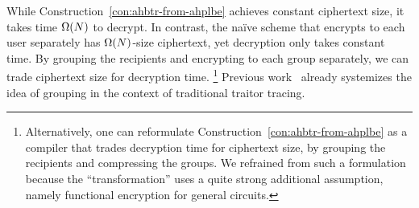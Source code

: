 While Construction~\ref{con:ahbtr-from-ahplbe} achieves constant ciphertext size,
it takes time $\operatorname{\Omega}(N)$ to decrypt.
In contrast, the na{\"i}ve scheme that encrypts to each user separately has $\operatorname{\Omega}(N)$-size ciphertext,
yet decryption only takes constant time.
By grouping the recipients and encrypting to each group separately,
we can trade ciphertext size for decryption time.%
\footnote{Alternatively, one can reformulate Construction~\ref{con:ahbtr-from-ahplbe} as a compiler that trades decryption time for ciphertext size, by grouping the recipients and compressing the groups.
We refrained from such a formulation because the ``transformation'' uses a quite strong additional assumption, namely functional encryption for general circuits.}
Previous work~\cite{C:Zhandry20} already systemizes the idea of grouping in the context of traditional traitor tracing.
